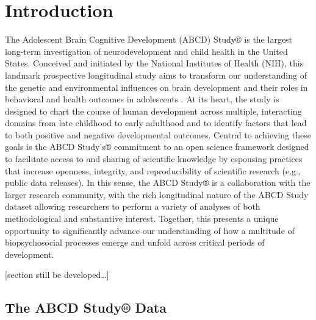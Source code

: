 \documentclass[
  10pt,
  letterpaper,
]{article}
\begin{document}
\linenumbers\hypertarget{introduction}{%
\section{Introduction}\label{introduction}}

\label{sec:headings} The Adolescent Brain Cognitive Development (ABCD)
Study® is the largest long-term investigation of neurodevelopment and
child health in the United States. Conceived and initiated by the
National Institutes of Health (NIH), this landmark prospective
longitudinal study aims to transform our understanding of the genetic
and environmental influences on brain development and their roles in
behavioral and health outcomes in adolescents \citep{volkow2018}. At its
heart, the study is designed to chart the course of human development
across multiple, interacting domains from late childhood to early
adulthood and to identify factors that lead to both positive and
negative developmental outcomes. Central to achieving these goals is the
ABCD Study's® commitment to an open science framework designed to
facilitate access to and sharing of scientific knowledge by espousing
practices that increase openness, integrity, and reproducibility of
scientific research (e.g., public data releases). In this sense, the
ABCD Study® is a collaboration with the larger research community, with
the rich longitudinal nature of the ABCD Study dataset allowing
researchers to perform a variety of analyses of both methodological and
substantive interest. Together, this presents a unique opportunity to
significantly advance our understanding of how a multitude of
biopsychosocial processes emerge and unfold across critical periods of
development.

{[}section still be developed\ldots{]}

\hypertarget{the-abcd-study-data}{%
\subsection{The ABCD Study® Data}\label{the-abcd-study-data}}
\end{document}
